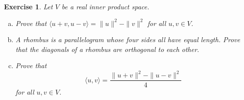 \documentclass{article}
\theoremstyle{plain}
\newtheorem{Q}{Exercise}{\bfseries}{\upshape}
\begin{document}
\begin{Q}
Let $V$ be a real inner product space.
\begin{enumerate}[(a)]
\item Prove that $\langle u+v, u-v\rangle = \|u\|^2 -\|v\|^2$ for all $u,v\in V$.
\item A rhombus is a parallelogram whose four sides all have equal length. Prove that the diagonals of a rhombus are orthogonal to each other.
\item  Prove that
\[\langle u, v\rangle = \frac{\|u+v\|^2-\|u-v\|^2}{4}\]
for all $u,v\in V$.
\end{enumerate}
\end{Q}
\begin{comment}
\textbf{Solution:}
\begin{enumerate}[(a)]
\item \begin{align*}
\langle u+v,u-v\rangle &= \langle u, u-v\rangle + \langle v,u-v \rangle\\
&=\langle u, u \rangle - \langle u,v \rangle + \langle v, u \rangle - \langle v, v \rangle\\
&= \|u\|^2 - \|v\|^2.
\end{align*}
\item Think about this picture:
\[\xymatrix{ & &\ar[rrr]^{u}\ar@{..>}[ddr] & & &\\
\\
\ar@{..>}[uurrrrr]\ar[uurr]^v\ar[rrr]_u & && \ar[uurr]_{v} 
}\]
This is a rhombus. The up-right diagonal is given by $u+v$, and the down-right diagonal is given by $u-v$. By part (a) we have $\langle u+v, u-v\rangle = \|u\|^2 -\|v\|^2$, and by the assumption that $u$ and $v$ are the same length we have $\|u\|^2 =\|v\|^2$. So $\langle u+v, u-v\rangle = 0$, which means the diagonals are orthogonal to each other.
\item We could work through this calculation directly, but with a little cleverness we can use a trick and save some effort. Set $x = \frac{u+v}{2}$, and set $y = \frac{u-v}{2}$. Then $\langle u, v\rangle  = \langle x+y, x-y \rangle$, and by part (a) we have 
\[\langle x+y, x-y \rangle = \|x\|^2 -\|y\|^2 = \frac{\|u+v\|^2}{4} - \frac{\|u-v\|^2}{4}.\] 
\end{enumerate}
\end{comment}
\end{document}
